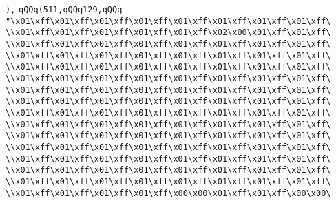 \verb|),|\newline
\verb|qQQq(511,qQQq129,qQQq|\newline
\verb|"\x01\xff\x01\xff\x01\xff\x01\xff\x01\xff\x01\xff\x01\xff\x01\xff\|\newline
\verb|\\x01\xff\x01\xff\x01\xff\x01\xff\x01\xff\x02\x00\x01\xff\x01\xff\|\newline
\verb|\\x01\xff\x01\xff\x01\xff\x01\xff\x01\xff\x01\xff\x01\xff\x01\xff\|\newline
\verb|\\x01\xff\x01\xff\x01\xff\x01\xff\x01\xff\x01\xff\x01\xff\x01\xff\|\newline
\verb|\\x01\xff\x01\xff\x01\xff\x01\xff\x01\xff\x01\xff\x01\xff\x01\xff\|\newline
\verb|\\x01\xff\x01\xff\x01\xff\x01\xff\x01\xff\x01\xff\x01\xff\x01\xff\|\newline
\verb|\\x01\xff\x01\xff\x01\xff\x01\xff\x01\xff\x01\xff\x01\xff\x01\xff\|\newline
\verb|\\x01\xff\x01\xff\x01\xff\x01\xff\x01\xff\x01\xff\x01\xff\x01\xff\|\newline
\verb|\\x01\xff\x01\xff\x01\xff\x01\xff\x01\xff\x01\xff\x01\xff\x01\xff\|\newline
\verb|\\x01\xff\x01\xff\x01\xff\x01\xff\x01\xff\x01\xff\x01\xff\x01\xff\|\newline
\verb|\\x01\xff\x01\xff\x01\xff\x01\xff\x01\xff\x01\xff\x01\xff\x01\xff\|\newline
\verb|\\x01\xff\x01\xff\x01\xff\x01\xff\x01\xff\x01\xff\x01\xff\x01\xff\|\newline
\verb|\\x01\xff\x01\xff\x01\xff\x01\xff\x01\xff\x01\xff\x01\xff\x01\xff\|\newline
\verb|\\x01\xff\x01\xff\x01\xff\x01\xff\x01\xff\x01\xff\x01\xff\x01\xff\|\newline
\verb|\\x01\xff\x01\xff\x01\xff\x01\xff\x01\xff\x01\xff\x01\xff\x01\xff\|\newline
\verb|\\x01\xff\x01\xff\x01\xff\x01\xff\x00\x00\x01\xff\x01\xff\x00\x00\|\newline
